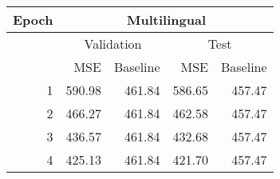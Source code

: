 \begin{tabular}{r|rr|rr}
     \hline
     \multirow{3}{*}{Epoch}    & \multicolumn{4}{c}{Multilingual} \\ 
     \hline
                               & \multicolumn{2}{c|}{Validation} &  \multicolumn{2}{c}{Test} \\
            &  MSE &  Baseline &  MSE &  Baseline \\
     \hline
     1 &   590.98 &                   461.84 &    586.65 &                    457.47 \\
     2 &   466.27 &                   461.84 &    462.58 &                    457.47 \\
     3 &   436.57 &                   461.84 &    432.68 &                    457.47 \\
     4 &   425.13 &                   461.84 &    421.70 &                    457.47 \\
     \hline
\end{tabular}
